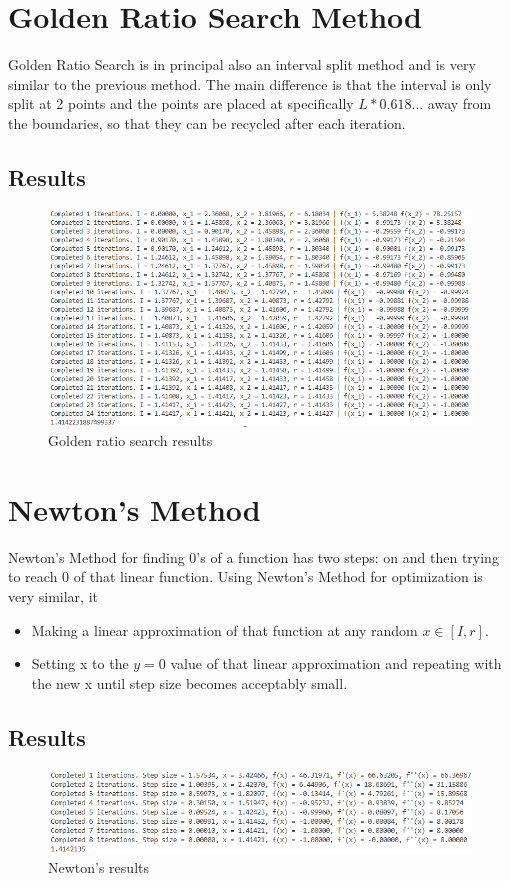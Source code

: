 \documentclass{article}
\begin{document}
    \section{Golden Ratio Search Method}
        Golden Ratio Search is in principal also an interval split method and is very similar to the previous method. The main difference is that the interval is only split at 2 points and the points are placed at specifically $L * 0.618...$ away from the boundaries, so that they can be recycled after each iteration.
        \subsection*{Results}
            \begin{figure}[H]
                \centering
                \includegraphics[width=1\textwidth]{golden-ratio.png}
                \caption{Golden ratio search results}
                \label{fig:ml}
            \end{figure}
    \section{Newton's Method}
        Newton's Method for finding 0's of a function has two steps: on  and then trying to reach 0 of that linear function. Using Newton's Method for optimization is very similar, it
        \begin{itemize}
            \item Making a linear approximation of that function at any random $x \in [I,r]$.
            \item Setting x to the $y=0$ value of that linear approximation and repeating with the new x until step size becomes acceptably small.
        \end{itemize}
        \subsection*{Results}
            \begin{figure}[H]
                \centering
                \includegraphics[width=1\textwidth]{newton.png}
                \caption{Newton's results}
                \label{fig:ml}
            \end{figure}
\end{document}
